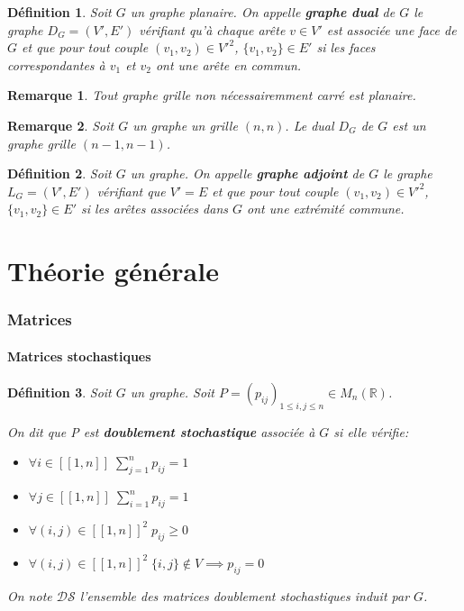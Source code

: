 \documentclass{article}
\newtheorem{definition}{Définition}[section]
\newtheorem{remark}{Remarque}[section]
\begin{document}
\begin{definition}
Soit $G$ un graphe planaire. On appelle \textbf{graphe dual} de $G$ le graphe $D_{G}=(V',E')$ vérifiant qu'à chaque arête $v \in V'$ est associée une face de $G$ et que pour tout couple $(v_{1},v_{2}) \in V'^{2}$, $\{v_{1},v_{2}\} \in E'$ si les faces correspondantes à $v_{1}$ et $v_{2}$ ont une arête en commun.
\end{definition}

\begin{remark}
Tout graphe grille non nécessairemment carré est planaire.
\end{remark}

\begin{remark}
Soit $G$ un graphe un grille $(n,n)$. Le dual $D_G$ de $G$ est un graphe grille $(n-1,n-1)$.
\end{remark}

\begin{definition}
Soit $G$ un graphe. On appelle \textbf{graphe adjoint} de $G$ le graphe $L_{G}=(V',E')$ vérifiant que $V'=E$ et que pour tout couple $(v_{1},v_{2}) \in V'^{2}$, $\{v_{1},v_{2}\} \in E'$ si les arêtes associées dans $G$ ont une extrémité commune.
\end{definition}


\part{Théorie générale}

\section{Matrices}
\subsection{Matrices stochastiques}

\begin{definition}
Soit $G$ un graphe.
Soit $P={(p_{ij})}_{1 \le i,j \le n} \in M_{n}(\mathbb{R})$.

On dit que P est \textbf{doublement stochastique} associée à $G$ si elle vérifie:

\begin{itemize}
\item $\forall i \in [\![1,n]\!] \; \sum\limits_{j=1}^{n}p_{ij}=1$
\item  $\forall j \in [\![1,n]\!] \; \sum\limits_{i=1}^{n}p_{ij}=1$
\item $\forall (i,j) \in [\![1,n]\!]^{2} \; p_{ij} \ge 0$
\item  $\forall (i,j) \in [\![1,n]\!]^2 \; \{i,j\} \notin V \implies p_{ij}=0$
\end{itemize}

On note $\mathcal{D}\mathcal{S}$ l'ensemble des matrices doublement stochastiques induit par $G$.
\end{definition}
\end{document}
